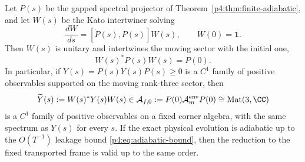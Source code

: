 \documentclass[12pt,a4paper]{article}
\begin{document}
\begin{theorem}
\label{p4:thm:transported-frame-sector}
Let $P(s)$ be the gapped spectral projector of Theorem~\ref{p4:thm:finite-adiabatic}, and let $W(s)$ be the Kato intertwiner solving
\begin{equation}
\label{p4:eq:kato-intertwiner}
\frac{dW}{ds}=[\dot P(s),P(s)]W(s),
\qquad
W(0)=\mathbf 1.
\end{equation}
Then $W(s)$ is unitary and intertwines the moving sector with the initial one,
\begin{equation}
\label{p4:eq:intertwiner-projector}
W(s)^*P(s)W(s)=P(0).
\end{equation}
In particular, if $Y(s)=P(s)Y(s)P(s)\ge 0$ is a $C^1$ family of positive observables supported on the moving rank-three sector, then
\begin{equation}
\label{p4:eq:transported-observable}
\widetilde Y(s):=W(s)^*Y(s)W(s)
\in
\mathcal A_{f,0}:=P(0)\mathcal A_m^{\mathrm{env}}P(0)\cong \mathrm{Mat}(3,\CC)
\end{equation}
is a $C^1$ family of positive observables on a fixed corner algebra, with the same spectrum as $Y(s)$ for every $s$.
If the exact physical evolution is adiabatic up to the $O(T^{-1})$ leakage bound \eqref{p4:eq:adiabatic-bound}, then the reduction to the fixed transported frame is valid up to the same order.
\end{theorem}
\end{document}
